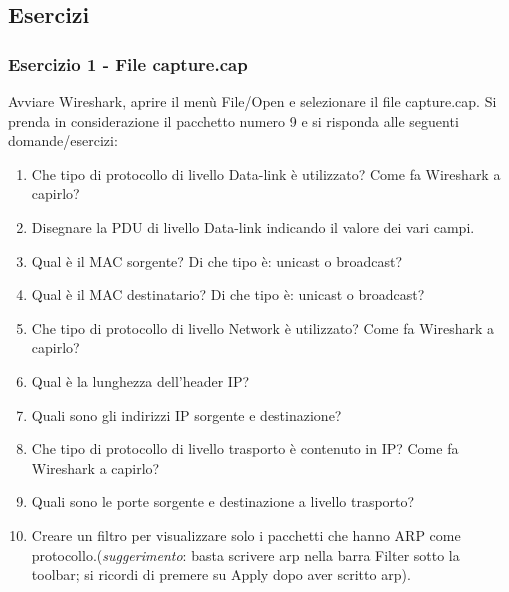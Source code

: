 \documentclass[a4paper]{article}
\begin{document}
	\subsection[\textcolor{Red3}{\textbf{Esercizi}}]{Esercizi}
	
	\subsubsection{Esercizio 1 - File \textsf{capture.cap}}
	
	Avviare Wireshark, aprire il menù \textsf{File/Open} e selezionare il file \textsf{capture.cap}.\newline
	Si prenda in considerazione il pacchetto numero 9 e si risponda alle seguenti domande/esercizi:
	\begin{enumerate}
		\item Che tipo di protocollo di livello Data-link è utilizzato? Come fa Wireshark a capirlo?
		
		\item Disegnare la PDU di livello Data-link indicando il valore dei vari campi.
		
		\item Qual è il MAC sorgente? Di che tipo è: unicast o broadcast?
		
		\item Qual è il MAC destinatario? Di che tipo è: unicast o broadcast?
		
		\item Che tipo di protocollo di livello Network è utilizzato? Come fa Wireshark a capirlo?
		
		\item Qual è la lunghezza dell'header IP?
		
		\item Quali sono gli indirizzi IP sorgente e destinazione?
		
		\item Che tipo di protocollo di livello trasporto è contenuto in IP? Come fa Wireshark a capirlo?
		
		\item Quali sono le porte sorgente e destinazione a livello trasporto?
		
		\item Creare un filtro per visualizzare solo i pacchetti che hanno ARP come protocollo.\newline (\emph{suggerimento}: basta scrivere \textsf{arp} nella barra \textsf{Filter} sotto la toolbar; si ricordi di premere su \textsf{Apply} dopo aver scritto \textsf{arp}).
		

\end{enumerate}
\end{document}

